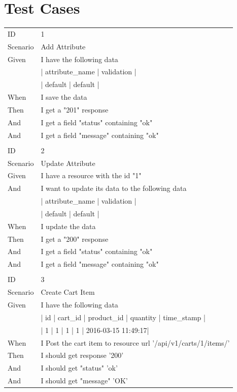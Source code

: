 \documentclass{report}
\begin{document}
\chapter{Test Cases}
\begin{tabular}{ l l }
ID 			& 1 \\
Scenario		& Add Attribute\\
Given 		& I have the following data \\
			& | attribute\_name | validation | \\
      		& | default | default | \\
When 		& I save the data \\
Then 		& I get a "201" response \\
And			& I get a field "status" containing "ok" \\
And 			& I get a field "message" containing "ok" \\ \\
ID 			& 2 \\
Scenario		& Update Attribute \\
Given 		& I have a resource with the id "1" \\
And 			& I want to update its data to the following data \\
      		& | attribute\_name | validation | \\
      		& | default | default | \\
When 		& I update the data \\
Then 		& I get a "200" response \\
And 			& I get a field "status" containing "ok" \\
And 			& I get a field "message" containing "ok" \\ \\
ID 			& 3 \\
Scenario		& Create Cart Item \\
Given 		& I have the following data \\
     		& | id | cart\_id | product\_id | quantity   | time\_stamp |\\
     		& | 1  | 1       | 1          | 1          | 2016-03-15 11:49:17|\\
When 		& I Post the cart item to resource url  '/api/v1/carts/1/items/' \\
Then 		& I should get response '200' \\
And 			& I should get "status" 'ok'\\
And 			& I should get "message" 'OK'

\end{tabular}
\newpage
\end{document}
